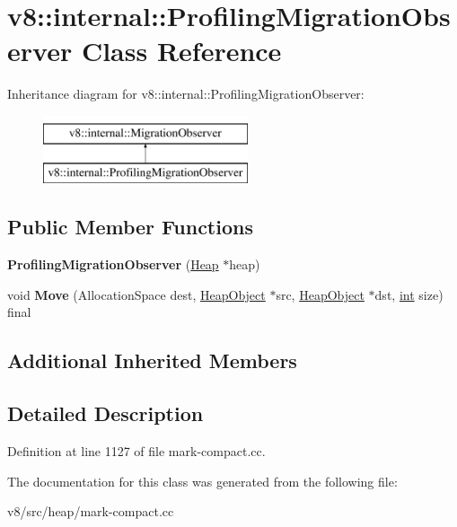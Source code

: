 \hypertarget{classv8_1_1internal_1_1ProfilingMigrationObserver}{}\section{v8\+:\+:internal\+:\+:Profiling\+Migration\+Observer Class Reference}
\label{classv8_1_1internal_1_1ProfilingMigrationObserver}
Inheritance diagram for v8\+:\+:internal\+:\+:Profiling\+Migration\+Observer\+:\begin{figure}[H]
\begin{center}
\leavevmode
\includegraphics[height=2.000000cm]{classv8_1_1internal_1_1ProfilingMigrationObserver}
\end{center}
\end{figure}
\subsection*{Public Member Functions}
\begin{DoxyCompactItemize}
\item 
\mbox{\label{classv8_1_1internal_1_1ProfilingMigrationObserver_a0a790431ab1d0d16b7d0b45393391cb0}} 
{\bfseries Profiling\+Migration\+Observer} (\mbox{\hyperlink{classv8_1_1internal_1_1Heap}{Heap}} $\ast$heap)
\item 
\mbox{\label{classv8_1_1internal_1_1ProfilingMigrationObserver_af5a27efe27f13d03fa96a54ede7a93f7}} 
void {\bfseries Move} (Allocation\+Space dest, \mbox{\hyperlink{classv8_1_1internal_1_1HeapObject}{Heap\+Object}} $\ast$src, \mbox{\hyperlink{classv8_1_1internal_1_1HeapObject}{Heap\+Object}} $\ast$dst, \mbox{\hyperlink{classint}{int}} size) final
\end{DoxyCompactItemize}
\subsection*{Additional Inherited Members}


\subsection{Detailed Description}


Definition at line 1127 of file mark-\/compact.\+cc.



The documentation for this class was generated from the following file\+:\begin{DoxyCompactItemize}
\item 
v8/src/heap/mark-\/compact.\+cc\end{DoxyCompactItemize}
